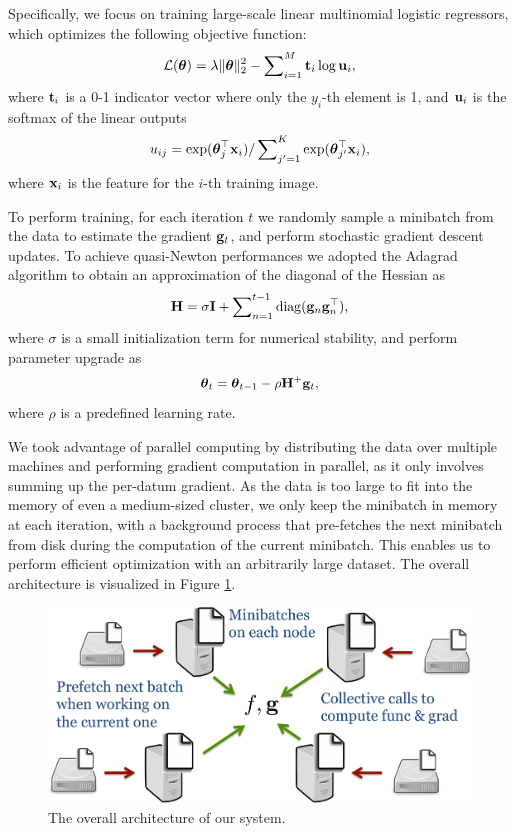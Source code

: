 Specifically, we focus on training large-scale linear multinomial logistic regressors, which optimizes the following objective function:
\begin{equation}\label{eqn:loss}
    \mathcal{L}(\boldsymbol{\theta}) = \lambda \|\boldsymbol{\theta}\|_2^2 - \sum\nolimits_{i=1}^{M}\mathbf{t}_i \log \mathbf{u}_{i},
\end{equation}
where $\mathbf{t}_i$ is a 0-1 indicator vector where only the $y_i$-th element is 1, and $\mathbf{u}_i$ is the softmax of the linear outputs
\begin{equation}
    u_{ij} = \exp(\boldsymbol{\theta}_j^\top\mathbf{x}_i) / \sum\nolimits_{j'=1}^{K}\exp(\boldsymbol{\theta}_{j'}^\top\mathbf{x}_i),
\end{equation}
where $\mathbf{x}_i$ is the feature for the $i$-th training image.

To perform training, for each iteration $t$ we randomly sample a minibatch from the data to estimate the gradient $\mathbf{g}_t$, and perform stochastic gradient descent updates. To achieve quasi-Newton performances we adopted the Adagrad \cite{duchi2010adaptive} algorithm to obtain an approximation of the diagonal of the Hessian as
\begin{equation}
\mathbf{H} = \sigma\mathbf{I} + \sum\nolimits_{n=1}^{t-1}\mathrm{diag}(\mathbf{g}_{n}\mathbf{g}_{n}^\top) ,
\end{equation}
where $\sigma$ is a small initialization term for numerical stability, and perform parameter upgrade as
\begin{equation}
\boldsymbol{\theta}_{t} = \boldsymbol{\theta}_{t-1} - \rho\mathbf{H}^{+}\mathbf{g}_t ,
\end{equation}
where $\rho$ is a predefined learning rate.

We took advantage of parallel computing by distributing the data over multiple machines and performing gradient computation in parallel, as it only involves summing up the per-datum gradient. As the data is too large to fit into the memory of even a medium-sized cluster, we only keep the minibatch in memory at each iteration, with a background process that pre-fetches the next minibatch from disk during the computation of the current minibatch. This enables us to perform efficient optimization with an arbitrarily large dataset. The overall architecture is visualized in Figure \ref{fig:architecture}.

\begin{figure}
  \centering
  \includegraphics[width=0.7\linewidth]{figs/taskadaptation/architecture.pdf}
  \caption{The overall architecture of our system.}\label{fig:architecture}
\end{figure}

